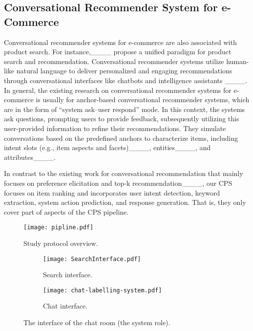 \subsection{Conversational Recommender System for e-Commerce} Conversational recommender systems for e-commerce are also associated with product search. For instance,____ propose a unified paradigm for product search and recommendation. Conversational recommender systems utilize human-like natural language to deliver personalized and engaging recommendations through conversational interfaces like chatbots and intelligence assistants ____. In general, the existing research on conversational recommender systems for e-commerce is usually for anchor-based conversational recommender systems, which are in the form of ``system ask--user respond'' mode. In this context, the systems ask questions, prompting users to provide feedback, subsequently utilizing this user-provided information to refine their recommendations. They simulate conversations based on the predefined anchors to characterize items, including intent slots (e.g., item aspects and facets)____, entities____, and attributes____. 

In contrast to the existing work for conversational recommendation that mainly focuses on preference elicitation and top-k recommendation____, our \ac{CPS} focuses on item ranking and incorporates user intent detection, keyword extraction, system action prediction, and response generation. That is, they only cover part of aspects of the \ac{CPS} pipeline. 

\begin{figure}[t]
\centering
\texttt{[image: pipline.pdf]}
\caption{Study protocol overview.}
\label{fig:pipline}
\end{figure}

\begin{figure*}[tb]
\centering
\begin{subfigure}{0.228\textwidth}%
    \texttt{[image: SearchInterface.pdf]}
    \caption{Search interface.}
\end{subfigure}
\begin{subfigure}{0.62\textwidth}%
    \texttt{[image: chat-labelling-system.pdf]}
    \caption{Chat interface.}
\end{subfigure}
\caption{The interface of the chat room (the system role).}
\label{fig:sysinterface}
\end{figure*}

